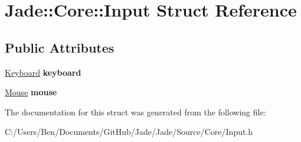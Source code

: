 \hypertarget{struct_jade_1_1_core_1_1_input}{}\section{Jade\+:\+:Core\+:\+:Input Struct Reference}
\label{struct_jade_1_1_core_1_1_input}
\subsection*{Public Attributes}
\begin{DoxyCompactItemize}
\item 
\hypertarget{struct_jade_1_1_core_1_1_input_ac90105abf790bfbd370d25bd83e1d24b}{}\hyperlink{class_jade_1_1_core_1_1_keyboard}{Keyboard} {\bfseries keyboard}\label{struct_jade_1_1_core_1_1_input_ac90105abf790bfbd370d25bd83e1d24b}

\item 
\hypertarget{struct_jade_1_1_core_1_1_input_a2771f6b48b14c726e587f62356ecae94}{}\hyperlink{class_jade_1_1_core_1_1_mouse}{Mouse} {\bfseries mouse}\label{struct_jade_1_1_core_1_1_input_a2771f6b48b14c726e587f62356ecae94}

\end{DoxyCompactItemize}


The documentation for this struct was generated from the following file\+:\begin{DoxyCompactItemize}
\item 
C\+:/\+Users/\+Ben/\+Documents/\+Git\+Hub/\+Jade/\+Jade/\+Source/\+Core/Input.\+h\end{DoxyCompactItemize}
